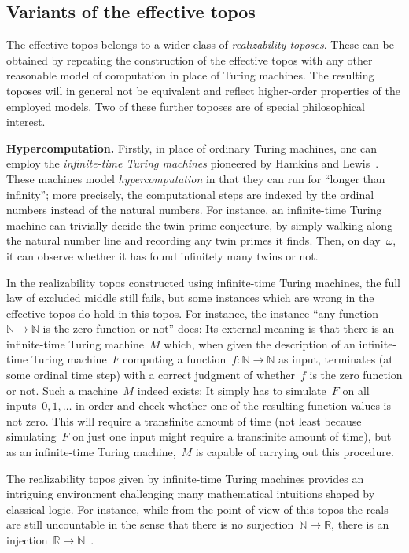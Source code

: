 \documentclass[oneside,reqno]{amsart}
\theoremstyle{definition}
\theoremstyle{plain}
\theoremstyle{remark}
\newcommand{\NN}{\mathbb{N}}
\newcommand{\RR}{\mathbb{R}}
\renewcommand{\_}{\mathpunct{.}\,}
\newcommand{\effective}{ef{}fective\xspace}
\newcommand{\?}{\,{:}\,}
\renewcommand{\paragraph}[1]{\noindent\textbf{#1.}}
\begin{document}
\subsection{Variants of the \effective topos} The \effective topos belongs to a
wider class of \emph{realizability toposes}. These can be obtained by repeating
the construction of the \effective topos with any other reasonable model of
computation in place of Turing machines. The resulting toposes will in general
not be equivalent and reflect higher-order properties of the employed models.
Two of these further toposes are of special philosophical interest.

\bigskip
\paragraph{Hypercomputation}
Firstly, in place of ordinary Turing machines, one can employ the
\emph{infinite-time Turing machines} pioneered by Hamkins and
Lewis~\cite{hamkins-lewis:ittm}. These machines model \emph{hypercomputation}
in that they can run for ``longer than infinity''; more precisely, the
computational steps are indexed by the ordinal numbers instead of the natural
numbers. For instance, an infinite-time Turing machine can trivially decide the
twin prime conjecture, by simply walking along the natural number line and
recording any twin primes it finds. Then, on day~$\omega$, it can observe
whether it has found infinitely many twins or not.

In the realizability topos constructed using infinite-time Turing machines, the full
law of excluded middle still fails, but some instances which are wrong in the
\effective topos do hold in this topos. For instance, the instance ``any
function~$\NN \to \NN$ is the zero function or not'' does: Its external meaning
is that there is an infinite-time Turing machine~$M$ which, when given the
description of an infinite-time Turing machine~$F$ computing a function~$f :
\NN \to \NN$ as input, terminates (at some ordinal time step) with a correct
judgment of whether~$f$ is the zero function or not. Such a machine~$M$ indeed
exists: It simply has to simulate~$F$ on all inputs~$0,1,\ldots$ in order and
check whether one of the resulting function values is not zero. This
will require a transfinite amount of time (not least because simulating~$F$ on
just one input might require a transfinite amount of time), but as an
infinite-time Turing machine,~$M$ is capable of carrying out this procedure.

The realizability topos given by infinite-time Turing machines provides an intriguing environment challenging many
mathematical intuitions shaped by classical logic. For instance, while from the
point of view of this topos the reals are still uncountable in the sense that
there is no surjection~$\NN \to \RR$, there is an injection~$\RR \to
\NN$~\cite{bauer:injection}.
\end{document}

